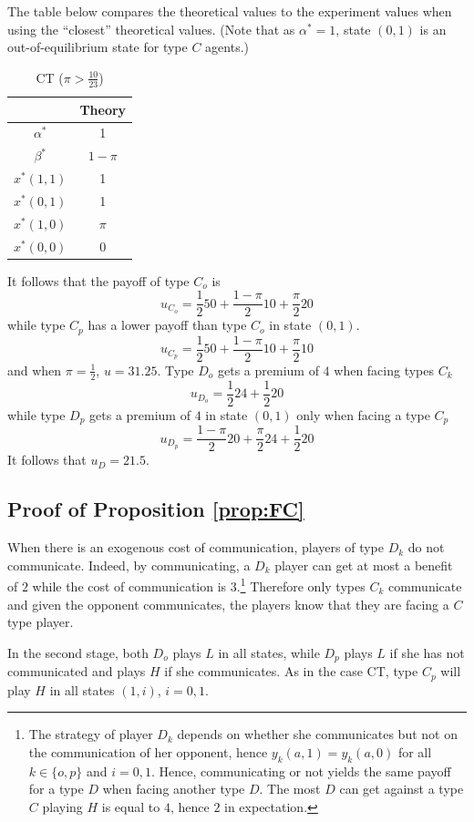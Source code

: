 \documentclass[12pt]{article}
\theoremstyle{break}
\begin{document}
The table below compares the theoretical values to the experiment values when using the ``closest'' theoretical values. (Note that as $\alpha^*=1$, state $(0,1)$ is an out-of-equilibrium state for type $C$ agents.)
%
\begin{table}[h!]
		\centering
		\begin{tabular}{c c}
		& Theory 	 \\
		\hline
		$\alpha^*$ 	& 1	\\
		$\beta^*$ 	& $1-\pi$ \\ 
		\hline
		$x^*(1,1)$ 	& 1	\\ 
		$x^*(0,1)$ & 1 \\ 
		$x^*(1,0)$ & $\pi$ \\
		$x^*(0,0)$ & 0 \\
			\hline
\end{tabular}
\caption{CT ($\pi>\frac{10}{23}$)}
\label{fig:C50}
\end{table}
%
It follows that the payoff of type $C_o$ is
%
\[
u_{C_o}=\frac{1}{2}50+\frac{1-\pi}{2}10+\frac{\pi}{2}20
\]
while type $C_p$ has a lower payoff than type $C_o$ in state $(0,1)$.
%
\[
	u_{C_p}=\frac{1}{2}50+\frac{1-\pi}{2}10+\frac{\pi}{2}10
\]
and when $\pi=\frac{1}{2}$, $u=31.25$. Type $D_o$ gets a premium of $4$ when facing types $C_k$ 
%
\[
u_{D_o}=\frac{1}{2}24+ \frac{1}{2}20
\]
while type $D_p$ gets a premium of $4$ in state $(0,1)$ only when facing a type $C_p$
\[
u_{D_p}=\frac{1-\pi}{2}20+\frac{\pi}{2}24+\frac{1}{2}20
\]
%
It follows that $u_D=21.5$.
%
%
%   
%    

\subsection*{Proof of Proposition \ref{prop:FC}}
When there is an exogenous cost of communication, players of type $D_k$ do not communicate. Indeed, by communicating, a $D_k$ player can get at most a benefit of $2$ while the cost of communication is $3$.\footnote{%
The strategy of player $D_k$ depends on whether she communicates but not on the communication of her opponent, hence $y_k(a,1)=y_k(a,0)$ for all $k\in\{o,p\}$ and $i=0,1$. Hence, communicating or not yields the same payoff for a type $D$ when facing another type $D$. The most $D$ can get against a type $C$ playing $H$ is equal to $4$, hence $2$ in expectation.
} Therefore only types $C_k$ communicate and given the opponent communicates, the players know that they are facing a $C$ type player. 

In the second stage, both $D_o$ plays $L$ in all states, while $D_p$ plays $L$ if she has not communicated and plays $H$ if she communicates. As in the case CT, type $C_p$ will play $H$ in all states $(1,i)$, $i=0,1$. 
\end{document}
